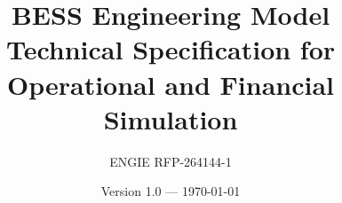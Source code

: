 \documentclass[11pt, a4paper]{article}
\title{
  \textbf{BESS Engineering Model} \\[0.5em]
  \large Technical Specification for Operational and Financial Simulation
}
\author{ENGIE RFP-264144-1}
\date{Version 1.0 --- \today}
\begin{document}
\maketitle

\tableofcontents
\newpage






\usepackage{iftex}
\ifPDFTeX
  \usepackage[utf8]{inputenc}
  \usepackage[T1]{fontenc}
\fi
\end{document}
